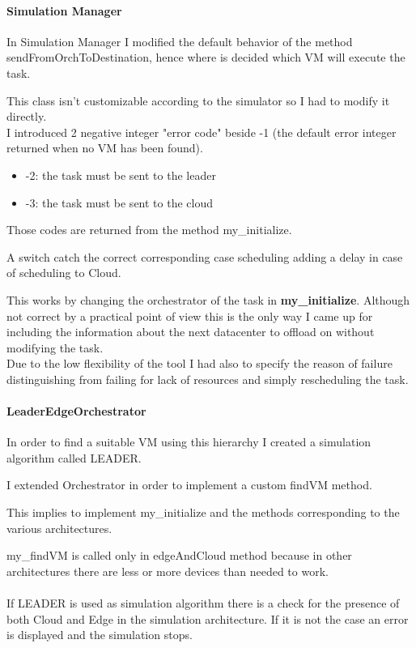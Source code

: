 \documentclass[12pt]{report}
\begin{document}
\paragraph{Simulation Manager}

In Simulation Manager I modified the default behavior of the method sendFromOrchToDestination, hence where is decided which VM will execute the task.

This class isn't customizable according to the simulator so I had to modify it directly.\\
I introduced 2 negative integer "error code" beside -1 (the default error integer returned when no VM has been found).
\begin{itemize}
	\item -2: the task must be sent to the leader
	\item -3: the task must be sent to the cloud
\end{itemize}

Those codes are returned from the method my\_initialize.

A switch catch the correct corresponding case scheduling  adding a delay in case of scheduling to Cloud.

This works by changing the orchestrator of the task in \textbf{my\_initialize}. Although not correct by a practical point of view this is the only way I came up for including the information about the next datacenter to offload on without modifying the task.\\
Due to the low flexibility of the tool I had also to specify the reason of failure distinguishing from failing for lack of resources and simply rescheduling the task.


\paragraph{LeaderEdgeOrchestrator}

In order to find a suitable VM using this hierarchy I created a simulation algorithm called LEADER.

I extended Orchestrator in order to implement a custom findVM method.

This implies to implement my\_initialize and the methods corresponding to the various architectures.

my\_findVM is called only in edgeAndCloud method because in other architectures there are less or more devices than needed to work.\\\\
If LEADER is used as simulation algorithm there is a check for the presence of both Cloud and Edge in the simulation architecture. If it is not the case an error is displayed and the simulation stops.
\end{document}

